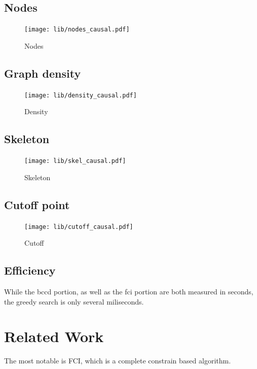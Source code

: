 \documentclass[11pt,a4paper]{report}
\begin{document}
\section{Nodes}
\begin{figure}
  \centering
  \texttt{[image: lib/nodes\_causal.pdf]}
  \caption{Nodes}
  \label{nodes_causal}
\end{figure}

\section{Graph density}
\begin{figure}[h]
  \centering
  \texttt{[image: lib/density\_causal.pdf]}
  \caption{Density}
  \label{density_causal}
\end{figure}

\section{Skeleton}
\begin{figure}
  \centering
  \texttt{[image: lib/skel\_causal.pdf]}
  \caption{Skeleton}
  \label{skel_causal}
\end{figure}

\section{Cutoff point}
\begin{figure}
  \centering
  \texttt{[image: lib/cutoff\_causal.pdf]}
  \caption{Cutoff}
  \label{cutoff_causal}
\end{figure}

\section{Efficiency}
While the bccd portion, as well as the fci portion are both measured in
seconds, the greedy search is only several miliseconds.

\chapter{Related Work}\label{relatedwork}
The most notable is
FCI\cite{spirtesCausationPredictionSearch2000}, which is a complete
\cite{zhangCompletenessOrientationRules2008} constrain based algorithm.
\end{document}
